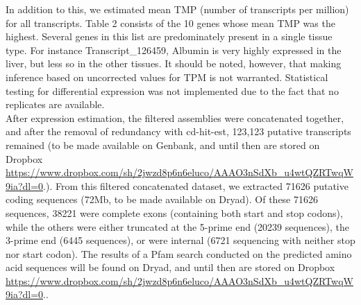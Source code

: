 \documentclass[11pt]{article}
\begin{document}
In addition to this, we estimated mean TMP (number of transcripts per million) for all transcripts. {\hypertarget{Table 2}{Table 2}} consists of the 10 genes whose mean TMP was the highest. Several genes in this list are predominately  present in a single tissue type. For instance Transcript\_126459, Albumin is very highly expressed in the liver, but less so in the other tissues. It should be noted, however, that making inference based on uncorrected values for TPM is not warranted. Statistical testing for differential expression was not implemented due to the fact that no replicates are available.  \\  

After expression estimation, the filtered assemblies were concatenated together, and after the removal of redundancy with cd-hit-est, 123,123 putative transcripts remained (to be made available on Genbank, and until then are stored on Dropbox \url{https://www.dropbox.com/sh/2jwzd8p6n6eluco/AAAO3nSdXb_u4wtQZRTwqW9ia?dl=0}.). From this filtered concatenated dataset, we extracted 71626 putative coding sequences (72Mb, to be made available on Dryad). Of these 71626 sequences, 38221 were complete exons (containing both start and stop codons), while the others were either truncated at the 5-prime end (20239 sequences), the 3-prime end (6445 sequences), or were internal (6721 sequencing with neither stop nor start codon). The results of a Pfam search conducted on the predicted amino acid sequences will be found on Dryad, and until then are stored on Dropbox \url{https://www.dropbox.com/sh/2jwzd8p6n6eluco/AAAO3nSdXb_u4wtQZRTwqW9ia?dl=0}.. \\
\end{document}
